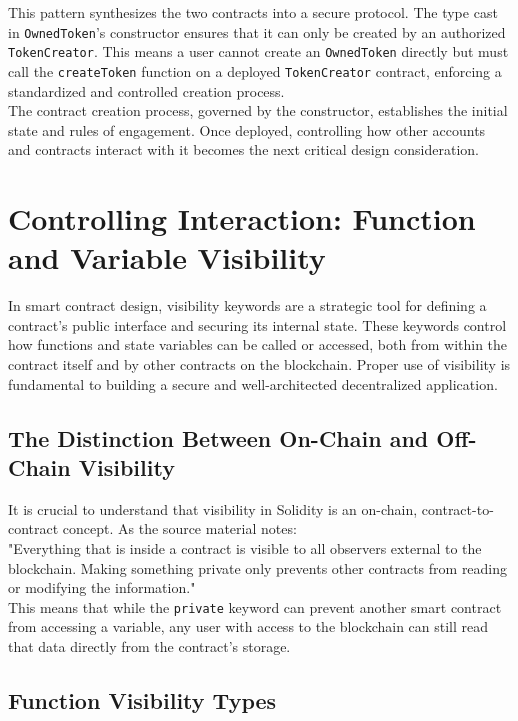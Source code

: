 \documentclass{scrbook}
\begin{document}
This pattern synthesizes the two contracts into a secure protocol. The type cast in \texttt{OwnedToken}'s constructor ensures that it can only be created by an authorized \texttt{TokenCreator}. This means a user cannot create an \texttt{OwnedToken} directly but must call the \texttt{createToken} function on a deployed \texttt{TokenCreator} contract, enforcing a standardized and controlled creation process.\\

The contract creation process, governed by the constructor, establishes the initial state and rules of engagement. Once deployed, controlling how other accounts and contracts interact with it becomes the next critical design consideration.

\chapter{Controlling Interaction: Function and Variable Visibility}

In smart contract design, visibility keywords are a strategic tool for defining a contract's public interface and securing its internal state. These keywords control how functions and state variables can be called or accessed, both from within the contract itself and by other contracts on the blockchain. Proper use of visibility is fundamental to building a secure and well-architected decentralized application.

\section{The Distinction Between On-Chain and Off-Chain Visibility}

It is crucial to understand that visibility in Solidity is an on-chain, contract-to-contract concept. As the source material notes:\\

"Everything that is inside a contract is visible to all observers external to the blockchain. Making something private only prevents other contracts from reading or modifying the information."\\

This means that while the \texttt{private} keyword can prevent another smart contract from accessing a variable, any user with access to the blockchain can still read that data directly from the contract's storage.

\section{Function Visibility Types}
\end{document}
